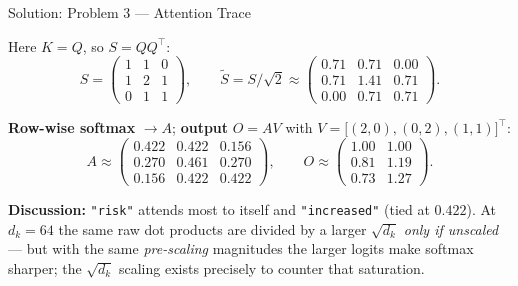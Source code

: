 \documentclass[9pt,t]{beamer}
\begin{document}
\begin{frame}{Solution: Problem 3 --- Attention Trace}

Here $K=Q$, so $S=QQ^\top$:
\[
S = \begin{pmatrix} 1 & 1 & 0 \\ 1 & 2 & 1 \\ 0 & 1 & 1 \end{pmatrix},
\qquad
\tilde S = S/\sqrt{2} \approx
\begin{pmatrix} 0.71 & 0.71 & 0.00 \\ 0.71 & 1.41 & 0.71 \\ 0.00 & 0.71 & 0.71 \end{pmatrix}.
\]

\textbf{Row-wise softmax} $\to A$; \quad \textbf{output} $O = AV$ with
$V=\big[(2,0),(0,2),(1,1)\big]^\top$:
\[
A \approx
\begin{pmatrix} 0.422 & 0.422 & 0.156 \\ 0.270 & 0.461 & 0.270 \\ 0.156 & 0.422 & 0.422 \end{pmatrix},
\qquad
O \approx
\begin{pmatrix} 1.00 & 1.00 \\ 0.81 & 1.19 \\ 0.73 & 1.27 \end{pmatrix}.
\]

\textbf{Discussion:} \texttt{"risk"} attends most to itself and \texttt{"increased"}
(tied at $0.422$). At $d_k=64$ the same raw dot products are divided by a larger
$\sqrt{d_k}$ \emph{only if unscaled} --- but with the same \emph{pre-scaling}
magnitudes the larger logits make softmax \alert{sharper}; the $\sqrt{d_k}$ scaling
exists precisely to counter that saturation.
\end{frame}
\end{document}
